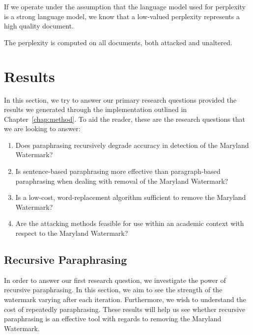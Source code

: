 \documentclass{l4proj}
\theoremstyle{definition}
\begin{document}
        If we operate under the assumption that the language model used for perplexity is a strong language model, we know that a low-valued perplexity represents a high quality document.

        The perplexity is computed on all documents, both attacked and unaltered. 


\chapter{Results} 
\label{chap:results}
In this section, we try to answer our primary research questions provided the results we generated through the implementation outlined in Chapter~\ref{chap:method}. To aid the reader, these are the research questions that we are looking to answer: 
\begin{enumerate}[label={\textbf{RQ\arabic*}:}, leftmargin=4em]
    \item Does paraphrasing recursively degrade accuracy in detection of the Maryland Watermark?
   \item Is sentence-based paraphrasing more effective than paragraph-based paraphrasing when dealing with removal of the Maryland Watermark?
    \item Is a low-cost, word-replacement algorithm sufficient to remove the Maryland Watermark? 
    \item Are the attacking methods feasible for use within an academic context with respect to the Maryland Watermark?
\end{enumerate}

\section{Recursive Paraphrasing}
    In order to answer our first research question, we investigate the power of recursive paraphrasing. In this section, we aim to see the strength of the watermark varying after each iteration. Furthermore, we wish to understand the cost of repeatedly paraphrasing. These results will help us see whether recursive paraphrasing is an effective tool with regards to removing the Maryland Watermark. 
\end{document}
